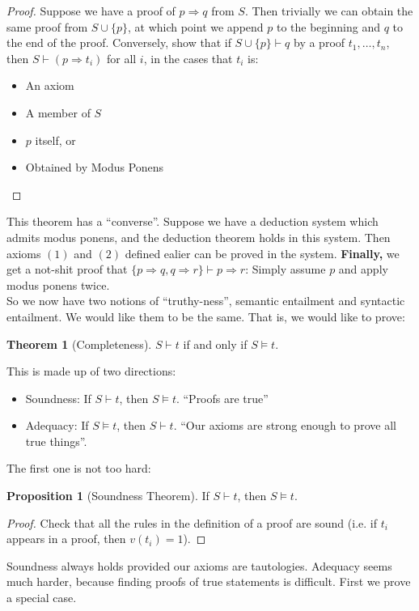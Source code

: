 \documentclass{article}
\theoremstyle{definition}
\newtheorem{proposition}{Proposition}
\newtheorem{theorem}{Theorem}
\numberwithin{definition}{section}
\newcommand{\entails}{\models}
\newcommand{\proves}{\vdash}
\begin{document}
\begin{proof}
Suppose we have a proof of $p \Rightarrow q$ from $S$. Then trivially we can obtain the same proof from $S \cup \{p\}$, at which point we append $p$ to the beginning and $q$ to the end of the proof. Conversely, show that if $S \cup \{p\} \proves q$ by a proof $t_{1},\ldots,t_{n}$, then $S \proves (p \Rightarrow t_{i})$ for all $i$, in the cases that $t_{i}$ is:
\begin{itemize}
\item An axiom
\item A member of $S$
\item $p$ itself, or
\item Obtained by Modus Ponens
\end{itemize}
\end{proof}
This theorem has a ``converse''. Suppose we have a deduction system which admits modus ponens, and the deduction theorem holds in this system. Then axioms $(1)$ and $(2)$ defined ealier can be proved in the system. \textbf{Finally,} we get a not-shit proof that $\{p \Rightarrow q,q \Rightarrow r\} \proves p \Rightarrow r$: Simply assume $p$ and apply modus ponens twice. \\
So we now have two notions of ``truthy-ness'', semantic entailment and syntactic entailment. We would like them to be the same. That is, we would like to prove:
\begin{theorem}[Completeness]
$S \proves t$ if and only if $S \entails t$. 
\end{theorem}
This is made up of two directions:
\begin{itemize}
\item Soundness: If $S \proves t$, then $S \entails t$. ``Proofs are true''
\item Adequacy: If $S \entails t$, then $S \proves t$. ``Our axioms are strong enough to prove all true things''.
\end{itemize}
The first one is not too hard:
\begin{proposition}[Soundness Theorem]
If $S \proves t$, then $S \entails t$. 
\end{proposition}
\begin{proof}
Check that all the rules in the definition of a proof are sound (i.e. if $t_{i}$ appears in a proof, then $v(t_{i})=1$). 
\end{proof}
Soundness always holds provided our axioms are tautologies. Adequacy seems much harder, because finding proofs of true statements is difficult. First we prove a special case.
\end{document}
